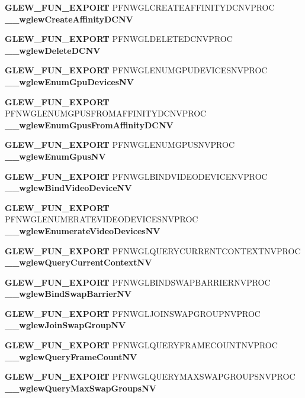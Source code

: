 \begin{DoxyCompactItemize}
{\bf G\+L\+E\+W\+\_\+\+F\+U\+N\+\_\+\+E\+X\+P\+O\+RT} P\+F\+N\+W\+G\+L\+C\+R\+E\+A\+T\+E\+A\+F\+F\+I\+N\+I\+T\+Y\+D\+C\+N\+V\+P\+R\+OC {\bf \+\_\+\+\_\+wglew\+Create\+Affinity\+D\+C\+NV}
\item 
{\bf G\+L\+E\+W\+\_\+\+F\+U\+N\+\_\+\+E\+X\+P\+O\+RT} P\+F\+N\+W\+G\+L\+D\+E\+L\+E\+T\+E\+D\+C\+N\+V\+P\+R\+OC {\bf \+\_\+\+\_\+wglew\+Delete\+D\+C\+NV}
\item 
{\bf G\+L\+E\+W\+\_\+\+F\+U\+N\+\_\+\+E\+X\+P\+O\+RT} P\+F\+N\+W\+G\+L\+E\+N\+U\+M\+G\+P\+U\+D\+E\+V\+I\+C\+E\+S\+N\+V\+P\+R\+OC {\bf \+\_\+\+\_\+wglew\+Enum\+Gpu\+Devices\+NV}
\item 
{\bf G\+L\+E\+W\+\_\+\+F\+U\+N\+\_\+\+E\+X\+P\+O\+RT} P\+F\+N\+W\+G\+L\+E\+N\+U\+M\+G\+P\+U\+S\+F\+R\+O\+M\+A\+F\+F\+I\+N\+I\+T\+Y\+D\+C\+N\+V\+P\+R\+OC {\bf \+\_\+\+\_\+wglew\+Enum\+Gpus\+From\+Affinity\+D\+C\+NV}
\item 
{\bf G\+L\+E\+W\+\_\+\+F\+U\+N\+\_\+\+E\+X\+P\+O\+RT} P\+F\+N\+W\+G\+L\+E\+N\+U\+M\+G\+P\+U\+S\+N\+V\+P\+R\+OC {\bf \+\_\+\+\_\+wglew\+Enum\+Gpus\+NV}
\item 
{\bf G\+L\+E\+W\+\_\+\+F\+U\+N\+\_\+\+E\+X\+P\+O\+RT} P\+F\+N\+W\+G\+L\+B\+I\+N\+D\+V\+I\+D\+E\+O\+D\+E\+V\+I\+C\+E\+N\+V\+P\+R\+OC {\bf \+\_\+\+\_\+wglew\+Bind\+Video\+Device\+NV}
\item 
{\bf G\+L\+E\+W\+\_\+\+F\+U\+N\+\_\+\+E\+X\+P\+O\+RT} P\+F\+N\+W\+G\+L\+E\+N\+U\+M\+E\+R\+A\+T\+E\+V\+I\+D\+E\+O\+D\+E\+V\+I\+C\+E\+S\+N\+V\+P\+R\+OC {\bf \+\_\+\+\_\+wglew\+Enumerate\+Video\+Devices\+NV}
\item 
{\bf G\+L\+E\+W\+\_\+\+F\+U\+N\+\_\+\+E\+X\+P\+O\+RT} P\+F\+N\+W\+G\+L\+Q\+U\+E\+R\+Y\+C\+U\+R\+R\+E\+N\+T\+C\+O\+N\+T\+E\+X\+T\+N\+V\+P\+R\+OC {\bf \+\_\+\+\_\+wglew\+Query\+Current\+Context\+NV}
\item 
{\bf G\+L\+E\+W\+\_\+\+F\+U\+N\+\_\+\+E\+X\+P\+O\+RT} P\+F\+N\+W\+G\+L\+B\+I\+N\+D\+S\+W\+A\+P\+B\+A\+R\+R\+I\+E\+R\+N\+V\+P\+R\+OC {\bf \+\_\+\+\_\+wglew\+Bind\+Swap\+Barrier\+NV}
\item 
{\bf G\+L\+E\+W\+\_\+\+F\+U\+N\+\_\+\+E\+X\+P\+O\+RT} P\+F\+N\+W\+G\+L\+J\+O\+I\+N\+S\+W\+A\+P\+G\+R\+O\+U\+P\+N\+V\+P\+R\+OC {\bf \+\_\+\+\_\+wglew\+Join\+Swap\+Group\+NV}
\item 
{\bf G\+L\+E\+W\+\_\+\+F\+U\+N\+\_\+\+E\+X\+P\+O\+RT} P\+F\+N\+W\+G\+L\+Q\+U\+E\+R\+Y\+F\+R\+A\+M\+E\+C\+O\+U\+N\+T\+N\+V\+P\+R\+OC {\bf \+\_\+\+\_\+wglew\+Query\+Frame\+Count\+NV}
\item 
{\bf G\+L\+E\+W\+\_\+\+F\+U\+N\+\_\+\+E\+X\+P\+O\+RT} P\+F\+N\+W\+G\+L\+Q\+U\+E\+R\+Y\+M\+A\+X\+S\+W\+A\+P\+G\+R\+O\+U\+P\+S\+N\+V\+P\+R\+OC {\bf \+\_\+\+\_\+wglew\+Query\+Max\+Swap\+Groups\+NV}

\end{DoxyCompactItemize}
